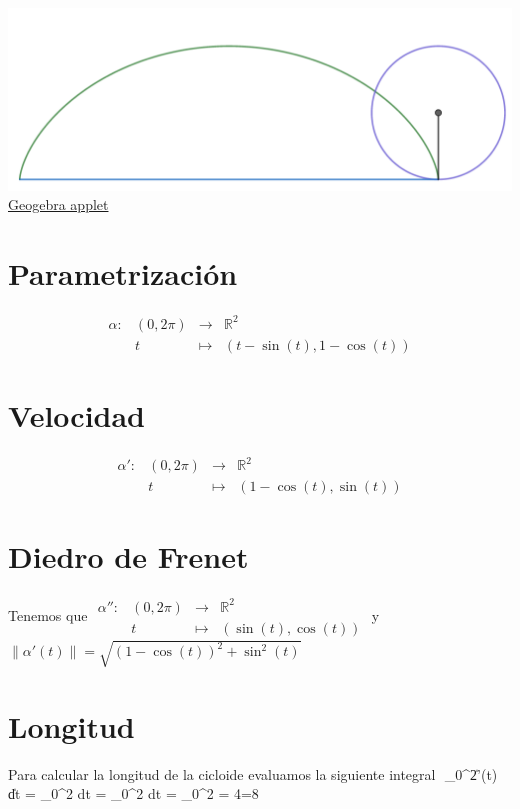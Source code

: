 \documentclass{article}
\newcommand{\bb}[1]{\mathbb{#1}}
\newcommand{\R}{\bb{R}}
\begin{document}
\begin{center}
\begin{align*}
\end{align*}
\includegraphics[scale=0.3]{figuras/cicloide descipcion 5.PNG}\\
\href{https://www.geogebra.org/calculator/ju6wnwpc}{Geogebra applet}
\end{center}
\section{Parametrización}
$$
\begin{array}{crcl}
\alpha : & (0,2\pi) & \longrightarrow & \bb{R}^2 \\
& t & \longmapsto     & (t-\sin(t),1-\cos(t))
\end{array}
$$
\section{Velocidad}
$$
\begin{array}{crcl}
\alpha' : & (0,2\pi) & \longrightarrow & \bb{R}^2 \\
& t & \longmapsto     & (1-\cos(t),\sin(t))
\end{array}
$$
\section{Diedro de Frenet}
Tenemos que $\begin{array}{crcl}
\alpha'' : & (0,2\pi) & \longrightarrow & \R^2 \\
& t & \longmapsto     & (\sin(t),\cos(t))
\end{array}$ y $\left\| \alpha'(t) \right\|=\sqrt{(1-\cos(t))^2+\sin^2(t)}$
\section{Longitud}
Para calcular la longitud de la cicloide evaluamos la siguiente integral
$$
\int_0^2\pi \left\| \alpha'(t) \right\| dt = \int_0^{2\pi}  dt = \int_0^{2\pi}  dt = _0^{2\pi} = 4=8
\end{document}
